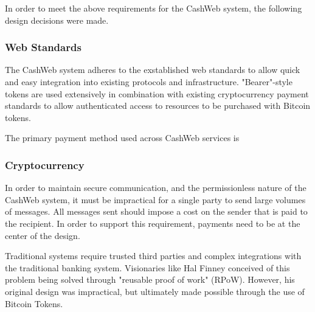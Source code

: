 \documentclass{article}
\begin{document}
In order to meet the above requirements for the CashWeb system, the following design decisions were made.

\subsubsection{Web Standards}

The CashWeb system adheres to the exstablished web standards to allow quick and easy integration into existing protocols and infrastructure. "Bearer"-style tokens are used extensively in combination with existing cryptocurrency payment standards to allow authenticated access to resources to be purchased with Bitcoin tokens.

The primary payment method used across CashWeb services is 


\subsubsection{Cryptocurrency}

In order to maintain secure communication, and the permissionless nature of the CashWeb system, it must be impractical for a single party to send large volumes of messages. All messages sent should impose a cost on the sender that is paid to the recipient. In order to support this requirement, payments need to be at the center of the design.

Traditional systems require trusted third parties and complex integrations with the traditional banking system. Visionaries like Hal Finney conceived of this problem being solved through "reusable proof of work" (RPoW). However, his original design was impractical, but ultimately made possible through the use of Bitcoin Tokens.
\end{document}
